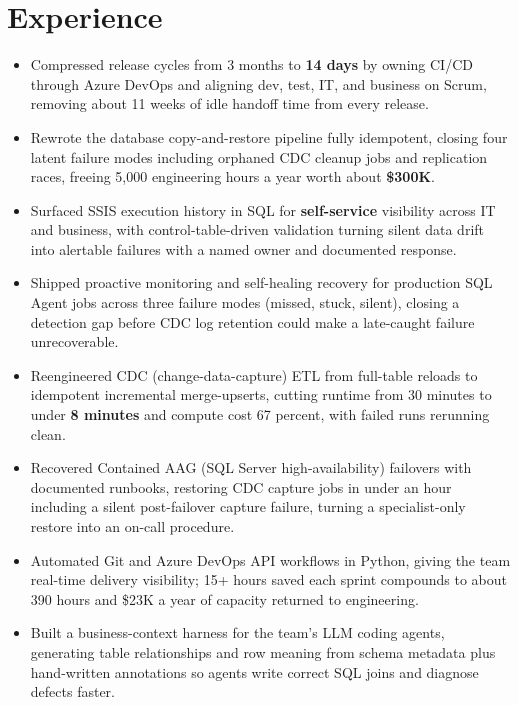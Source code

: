 \documentclass[letterpaper,10pt]{article}
\begin{document}
\section{Experience}
\begin{itemize}
\item Compressed release cycles from 3 months to \textbf{14 days} by owning CI/CD through Azure DevOps and aligning dev, test, IT, and business on Scrum, removing about 11 weeks of idle handoff time from every release.
\item Rewrote the database copy-and-restore pipeline fully idempotent, closing four latent failure modes including orphaned CDC cleanup jobs and replication races, freeing 5,000 engineering hours a year worth about \textbf{\$300K}.
\item Surfaced SSIS execution history in SQL for \textbf{self-service} visibility across IT and business, with control-table-driven validation turning silent data drift into alertable failures with a named owner and documented response.
\item Shipped proactive monitoring and self-healing recovery for production SQL Agent jobs across three failure modes (missed, stuck, silent), closing a detection gap before CDC log retention could make a late-caught failure unrecoverable.
\item Reengineered CDC (change-data-capture) ETL from full-table reloads to idempotent incremental merge-upserts, cutting runtime from 30 minutes to under \textbf{8 minutes} and compute cost 67 percent, with failed runs rerunning clean.
\item Recovered Contained AAG (SQL Server high-availability) failovers with documented runbooks, restoring CDC capture jobs in under an hour including a silent post-failover capture failure, turning a specialist-only restore into an on-call procedure.
\item Automated Git and Azure DevOps API workflows in Python, giving the team real-time delivery visibility; 15+ hours saved each sprint compounds to about 390 hours and \$23K a year of capacity returned to engineering.
\item Built a business-context harness for the team's LLM coding agents, generating table relationships and row meaning from schema metadata plus hand-written annotations so agents write correct SQL joins and diagnose defects faster.
\end{itemize}
\end{document}
